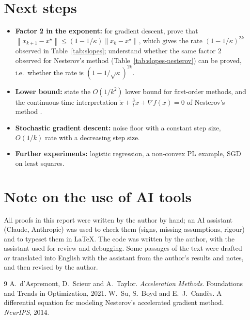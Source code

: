 \documentclass[11pt,a4paper]{article}
\theoremstyle{definition}
\theoremstyle{remark}
\newcommand{\norm}[1]{\left\lVert #1 \right\rVert}
\begin{document}
\section{Next steps}\label{sec:next}
\begin{itemize}
\item \textbf{Factor 2 in the exponent:} for gradient descent, prove that $\norm{x_{k+1} - x^\star} \le (1 - 1/\kappa)\norm{x_k - x^\star}$, which gives the rate $(1-1/\kappa)^{2k}$ observed in Table~\ref{tab:slopes}; understand whether the same factor $2$ observed for Nesterov's method (Table~\ref{tab:slopes-nesterov}) can be proved, i.e.\ whether the rate is $(1-1/\sqrt\kappa)^{2k}$.
\item \textbf{Lower bound:} state the $O(1/k^2)$ lower bound for first-order methods, and the continuous-time interpretation $\ddot x + \frac3t \dot x + \nabla f(x) = 0$ of Nesterov's method \cite{su}.
\item \textbf{Stochastic gradient descent:} noise floor with a constant step size, $O(1/k)$ rate with a decreasing step size.
\item \textbf{Further experiments:} logistic regression, a non-convex PL example, SGD on least squares.
\end{itemize}

\section*{Note on the use of AI tools}
All proofs in this report were written by the author by hand; an AI assistant (Claude, Anthropic) was used to check them (signs, missing assumptions, rigour) and to typeset them in \LaTeX. The code was written by the author, with the assistant used for review and debugging. Some passages of the text were drafted or translated into English with the assistant from the author's results and notes, and then revised by the author.

\begin{thebibliography}{9}
 A.~d'Aspremont, D.~Scieur and A.~Taylor. \emph{Acceleration Methods}. Foundations and Trends in Optimization, 2021.
 W.~Su, S.~Boyd and E.~J.~Cand\`es. A differential equation for modeling Nesterov's accelerated gradient method. \emph{NeurIPS}, 2014.
\end{thebibliography}
\end{document}
